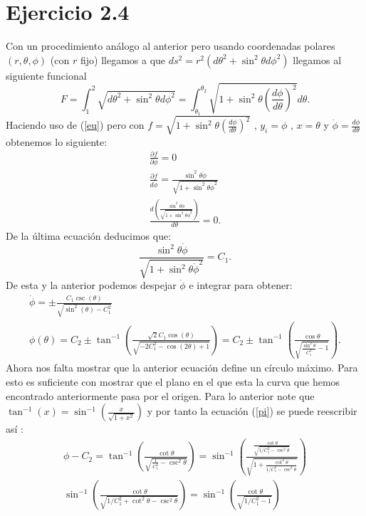 \documentclass[letterpaper,10pt]{article}
\begin{document}
\section*{Ejercicio 2.4 }
Con un procedimiento an\'alogo al anterior pero usando coordenadas polares $(r,\theta,\phi)$ (con $r$ fijo) llegamos a que $ds^2=r^2(d\theta^2+\sin^2 \theta d\phi^2) $ llegamos al siguiente funcional
\begin{equation}
 F=\int_1^2 \sqrt{d\theta^2+\sin^2\theta d\phi^2}=\int_{\theta_1}^{\theta_2}{\sqrt{1+\sin^2\theta (\frac{d\phi}{d\theta})^2} d\theta}.
\end{equation}
Haciendo uso de (\ref{eu}) pero con $f=\sqrt{1+\sin^2\theta (\frac{d\phi}{d\theta})^2}$ , $y_i=\phi$ , $x=\theta$ y $\dot \phi=\frac{d\phi}{d\theta}$
obtenemos lo siguiente:
\begin{eqnarray}
\frac{\partial f}{\partial \phi}=0\\
\frac{\partial f}{d\dot \phi}=\frac{\sin^2 \theta \dot \phi}{\sqrt{1+\sin^2 \theta  \dot \phi^2}}\\
\frac{d \left(\frac{\sin^2 \theta \dot \phi}{\sqrt{1+\sin^2 \theta  \dot \phi^2}}\right)}{d\theta}=0.
\end{eqnarray}
De la \'ultima ecuaci\'on deducimos que:
\begin{equation}
\frac{\sin^2 \theta \dot \phi}{\sqrt{1+\sin^2 \theta \dot \phi^2}}=C_1.
\end{equation}
De esta y la anterior podemos despejar $\dot \phi$ e integrar para obtener:
\begin{eqnarray}
\dot \phi=\pm \frac{C_1 \csc (\theta )}{\sqrt{\sin ^2(\theta )-C_1^2}}\\
\label{pi}
\phi(\theta)=C_2 \pm \tan ^{-1}\left(\frac{\sqrt{2} C_1 \cos (\theta
   )}{\sqrt{-2 C_1^2-\cos (2 \theta )+1}}\right)=C_2 \pm \tan ^{-1}\left(\frac{ \cos \theta
   }{\sqrt{\frac{\sin^2 \theta }{C_1^2} -1}}\right).
\end{eqnarray}
Ahora nos falta mostrar que la anterior ecuaci\'on define un c\'irculo m\'aximo. Para esto es suficiente con mostrar que el plano en el que esta la curva que hemos encontrado anteriormente pasa por el origen.
Para lo anterior note que $\tan^{-1}(x)=\sin^{-1}(\frac{x}{\sqrt{1+x^2}})$ y por tanto la ecuaci\'on (\ref{pi}) se  puede reescribir as\'i :
\begin{eqnarray}
\phi-C_2=\tan^{-1}\left(\frac{\cot \theta}{\sqrt{\frac{1}{C_1^2}-\csc^2\theta}   }  \right)=\sin^{-1} \left(   \frac{\frac{\cot \theta}{\sqrt{1/C_1^2-\csc^2 \theta}}}{\sqrt{1+\frac{\cot^2\theta}{1/C_1^2-\csc^2\theta}}} \right)\\
\sin^{-1}\left(\frac{\cot \theta}{\sqrt{1/C_1^2+\cot^2 \theta -\csc^2 \theta}}\right)=\sin^{-1}\left(\frac{\cot \theta}{\sqrt{1/C_1^2-1}} \right)
\end{eqnarray}
\end{document}
